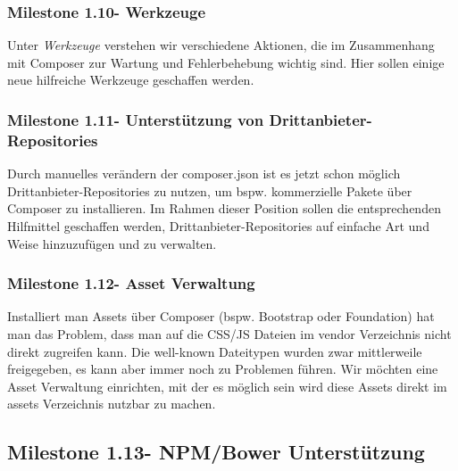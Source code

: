 \documentclass[
paper=a4,
draft=false,%
fontsize=10pt%
]{scrartcl}
\begin{document}
\subsubsection{Milestone 1.10\footnotemark - Werkzeuge}


Unter \emph{Werkzeuge} verstehen wir verschiedene Aktionen, die im Zusammenhang mit Composer zur Wartung und Fehlerbehebung wichtig sind. Hier sollen einige neue hilfreiche Werkzeuge geschaffen werden.

\subsubsection{Milestone 1.11\footnotemark - Unterstützung von Drittanbieter-Repositories}


Durch manuelles verändern der composer.json ist es jetzt schon möglich Drittanbieter-Repositories zu nutzen, um bspw. kommerzielle Pakete über Composer zu installieren. Im Rahmen dieser Position sollen die entsprechenden Hilfmittel geschaffen werden, Drittanbieter-Repositories auf einfache Art und Weise hinzuzufügen und zu verwalten.

\subsubsection{Milestone 1.12\footnotemark - Asset Verwaltung}


Installiert man Assets über Composer (bspw. Bootstrap oder Foundation) hat man das Problem, dass man auf die CSS/JS Dateien im vendor Verzeichnis nicht direkt zugreifen kann. Die well-known Dateitypen wurden zwar mittlerweile freigegeben, es kann aber immer noch zu Problemen führen. Wir möchten eine Asset Verwaltung einrichten, mit der es möglich sein wird diese Assets direkt im assets Verzeichnis nutzbar zu machen.

\subsection{Milestone 1.13\footnotemark - NPM/Bower Unterstützung}
\end{document}
